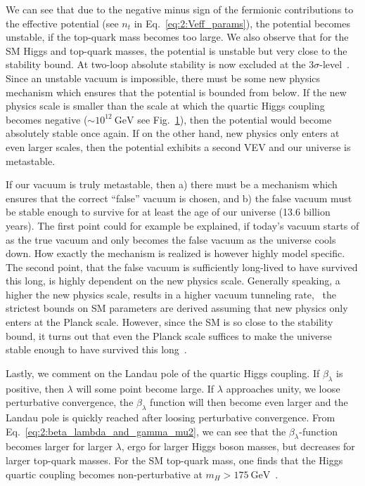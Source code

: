 \begin{figure}[h]
\begin{minipage}[t]{0.48\textwidth}
  \label{fig:2:running_couplings}
  \end{minipage}
\end{figure}
We can see that due to the negative minus sign of the fermionic contributions to the effective potential (see $n_t$ in Eq.~\eqref{eq:2:Veff_params}), the potential becomes unstable, if the top-quark mass becomes too large. We also observe that for the \acs{SM} Higgs and top-quark masses, the potential is unstable but very close to the stability bound. At two-loop absolute stability is now excluded at the $3\sigma$-level~\cite{Degrassi:2012ry}. Since an unstable vacuum is impossible, there must be some new physics mechanism which ensures that the potential is bounded from below. If the new physics scale is smaller than the scale at which the quartic Higgs coupling becomes negative ($\sim 10^{12}\ \mathrm{GeV}$ see Fig.~\ref{fig:2:running_couplings}), then the potential would become absolutely stable once again. If on the other hand, new physics only enters at even larger scales, then the potential exhibits a second \acs{VEV} and our universe is metastable.

If our vacuum is truly metastable, then a) there must be a mechanism which ensures that the correct ``false'' vacuum is chosen, and b) the false vacuum must be stable enough to survive for at least the age of our universe (13.6 billion years). The first point could for example be explained, if today's vacuum starts of as the true vacuum and only becomes the false vacuum as the universe cools down. How exactly the mechanism is realized is however highly model specific. The second point, that the false vacuum is sufficiently long-lived to have survived this long, is highly dependent on the new physics scale. Generally speaking, a higher the new physics scale, results in a higher vacuum tunneling rate, \ie\ the strictest bounds on \acs{SM} parameters are derived assuming that new physics only enters at the Planck scale. However, since the \acs{SM} is so close to the stability bound, it turns out that even the Planck scale suffices to make the universe stable enough to have survived this long~\cite{Degrassi:2012ry}.

Lastly, we comment on the Landau pole of the quartic Higgs coupling. If $\beta_\lambda$ is positive, then $\lambda$ will some point become large. If $\lambda$ approaches unity, we loose perturbative convergence, the $\beta_\lambda$ function will then become even larger and the Landau pole is quickly reached after loosing perturbative convergence. From  Eq.~\eqref{eq:2:beta_lambda_and_gamma_mu2}, we can see that the $\beta_\lambda$-function becomes larger for larger $\lambda$, ergo for larger Higgs boson masses, but decreases for larger top-quark masses. For the \acs{SM} top-quark mass, one finds that the Higgs quartic coupling becomes non-perturbative at $m_H > 175\ \mathrm{GeV}$~\cite{Degrassi:2012ry}.
